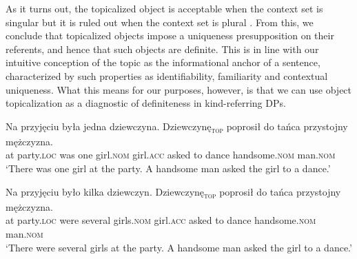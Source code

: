 \documentclass[output=paper,
colorlinks,
citecolor=brown,
newtxmath
]{langscibook}
\begin{document}
As it turns out, the topicalized object is acceptable when the context set is singular  but it is ruled out when the context set is plural . From this, we conclude that topicalized objects impose a uniqueness presupposition on their referents, and hence that such objects are definite. This is in line with our intuitive conception of the topic as the informational anchor of a sentence, characterized by such properties as identifiability, familiarity and contextual uniqueness. What this means for our purposes, however, is that we can use object topicalization as a diagnostic of definiteness in kind-referring DPs.

\ea \label{ex:party}
\ea \gll
Na przyjęciu była jedna dziewczyna. Dziewczynę\textsubscript{\textsc{top}} poprosił do tańca przystojny mężczyzna.\\
at party.\textsc{loc} was one girl.\textsc{nom} girl.\textsc{acc} asked to dance handsome.\textsc{nom} man.\textsc{nom}\\

\glt `There was one girl at the party. A handsome man asked the girl to a dance.' \label{ex:party_1}

\ex \gll
Na przyjęciu było kilka dziewczyn. \minsp{\#} Dziewczynę\textsubscript{\textsc{top}} poprosił do tańca przystojny mężczyzna.\\
at party.\textsc{loc} were several girls.\textsc{nom} {} girl.\textsc{acc} asked to dance handsome.\textsc{nom} man.\textsc{nom}\\

\glt `There were several girls at the party. A handsome man asked the girl to a dance.' \label{ex:party_2}
\z \z
\end{document}
